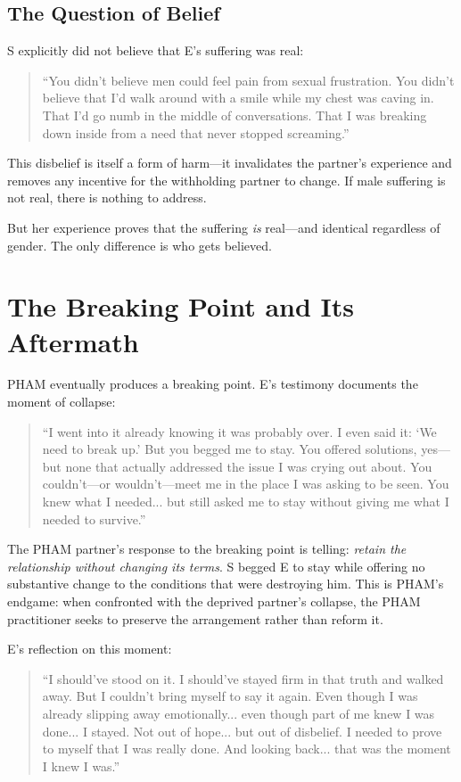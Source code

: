 \documentclass[12pt,openany]{book}
\numberwithin{equation}{chapter}
\begin{document}
\subsection{The Question of Belief}

S explicitly did not believe that E's suffering was real:

\begin{quote}
``You didn't believe men could feel pain from sexual frustration. You didn't believe that I'd walk around with a smile while my chest was caving in. That I'd go numb in the middle of conversations. That I was breaking down inside from a need that never stopped screaming.''
\end{quote}

This disbelief is itself a form of harm---it invalidates the partner's experience and removes any incentive for the withholding partner to change. If male suffering is not real, there is nothing to address.

But her experience proves that the suffering \textit{is} real---and identical regardless of gender. The only difference is who gets believed.

\section{The Breaking Point and Its Aftermath}

PHAM eventually produces a breaking point. E's testimony documents the moment of collapse:

\begin{quote}
``I went into it already knowing it was probably over. I even said it: `We need to break up.' But you begged me to stay. You offered solutions, yes---but none that actually addressed the issue I was crying out about. You couldn't---or wouldn't---meet me in the place I was asking to be seen. You knew what I needed... but still asked me to stay without giving me what I needed to survive.''
\end{quote}

The PHAM partner's response to the breaking point is telling: \textit{retain the relationship without changing its terms}. S begged E to stay while offering no substantive change to the conditions that were destroying him. This is PHAM's endgame: when confronted with the deprived partner's collapse, the PHAM practitioner seeks to preserve the arrangement rather than reform it.

E's reflection on this moment:

\begin{quote}
``I should've stood on it. I should've stayed firm in that truth and walked away. But I couldn't bring myself to say it again. Even though I was already slipping away emotionally... even though part of me knew I was done... I stayed. Not out of hope... but out of disbelief. I needed to prove to myself that I was really done. And looking back... that was the moment I knew I was.''
\end{quote}
\end{document}
